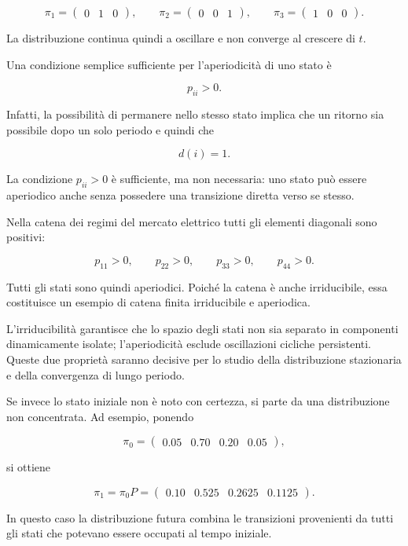 \[
\pi_1=
\begin{pmatrix}
0&1&0
\end{pmatrix},
\qquad
\pi_2=
\begin{pmatrix}
0&0&1
\end{pmatrix},
\qquad
\pi_3=
\begin{pmatrix}
1&0&0
\end{pmatrix}.
\]

La distribuzione continua quindi a oscillare e non converge al crescere
di \(t\).

Una condizione semplice sufficiente per l'aperiodicit\`{a} di uno stato
\`{e}

\[
p_{ii}>0.
\]

Infatti, la possibilit\`{a} di permanere nello stesso stato implica che
un ritorno sia possibile dopo un solo periodo e quindi che

\[
d(i)=1.
\]

La condizione \(p_{ii}>0\) \`{e} sufficiente, ma non necessaria:
uno stato pu\`{o} essere aperiodico anche senza possedere una
transizione diretta verso se stesso.

Nella catena dei regimi del mercato elettrico tutti gli elementi
diagonali sono positivi:

\[
p_{11}>0,
\qquad
p_{22}>0,
\qquad
p_{33}>0,
\qquad
p_{44}>0.
\]

Tutti gli stati sono quindi aperiodici. Poich\'{e} la catena \`{e}
anche irriducibile, essa costituisce un esempio di catena finita
irriducibile e aperiodica.

L'irriducibilit\`{a} garantisce che lo spazio degli stati non sia
separato in componenti dinamicamente isolate; l'aperiodicit\`{a}
esclude oscillazioni cicliche persistenti. Queste due propriet\`{a}
saranno decisive per lo studio della distribuzione stazionaria e della
convergenza di lungo periodo.

Se invece lo stato iniziale non \`{e} noto con certezza, si parte da una
distribuzione non concentrata. Ad esempio, ponendo

\[
\pi_0
=
\begin{pmatrix}
0.05 & 0.70 & 0.20 & 0.05
\end{pmatrix},
\]

si ottiene

\[
\pi_1
=
\pi_0P
=
\begin{pmatrix}
0.10 & 0.525 & 0.2625 & 0.1125
\end{pmatrix}.
\]

In questo caso la distribuzione futura combina le transizioni
provenienti da tutti gli stati che potevano essere occupati al tempo
iniziale.

